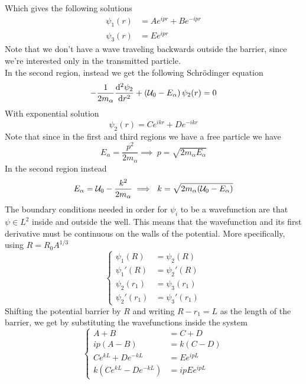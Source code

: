 \documentclass[../qm.tex]{subfiles}
\begin{document}
Which gives the following solutions
\begin{equation*}
	\begin{aligned}
		\psi_1(r)&=Ae^{ipr}+Be^{-ipr}\\
		\psi_3(r)&=Ee^{ipr}
	\end{aligned}
\end{equation*}
Note that we don't have a wave traveling backwards outside the barrier, since we're interested only in the transmitted particle.\\
In the second region, instead we get the following Schrödinger equation
\begin{equation*}
	-\frac{1}{2m_\alpha}\dv[2]{\psi_2}{r}+\left( \mathcal{U}_0-E_\alpha \right)\psi_2(r)=0
\end{equation*}
With exponential solution
\begin{equation*}
	\psi_2(r)=Ce^{ikr}+De^{-ikr}
\end{equation*}
Note that since in the first and third regions we have a free particle we have
\begin{equation*}
	E_\alpha=\frac{p^2}{2m_\alpha}\implies\ p=\sqrt{2m_\alpha E_\alpha}
\end{equation*}
In the second region instead
\begin{equation*}
	E_\alpha=\pot_0-\frac{k^2}{2m_\alpha}\implies\ k=\sqrt{2m_\alpha(\pot_0-E_\alpha)}
\end{equation*}
The boundary conditions needed in order for $\psi_i$ to be a wavefunction are that $\psi\in L^2$ inside and outside the well. This means that the wavefunction and its first derivative must be continuous on the walls of the potential. More specifically, using $R=R_0A^{1/3}$
\begin{equation}
	\left\{ \begin{aligned}
			\psi_1(R)&=\psi_2(R)\\
			\psi_1'(R)&=\psi_2'(R)\\
			\psi_2(r_1)&=\psi_3(r_1)\\
			\psi_2'(r_1)&=\psi_3'(r_1)
	\end{aligned}\right.
	\label{eq:quantumtunnelalpha}
\end{equation}
Shifting the potential barrier by $R$ and writing $R-r_1=L$ as the length of the barrier, we get by substituting the wavefunctions inside the system
\begin{equation}
	\left\{ \begin{aligned}
		A+B&=C+D\\
		ip\left( A-B \right)&=k\left( C-D \right)\\
		Ce^{kL}+De^{-kL}&=Ee^{ipL}\\
		k\left( Ce^{kL}-De^{-kL} \right)&=ipEe^{ipL}
	\end{aligned}\right.
	\label{eq:firstsystem}
\end{equation}
\end{document}
